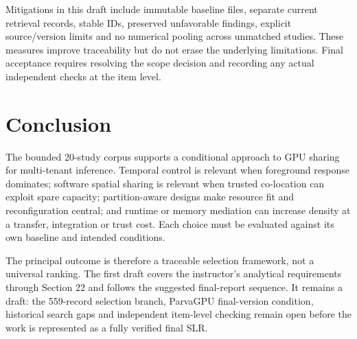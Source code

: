 Mitigations in this draft include immutable baseline files, separate current retrieval records, stable IDs, preserved unfavorable findings, explicit source/version limits and no numerical pooling across unmatched studies. These measures improve traceability but do not erase the underlying limitations. Final acceptance requires resolving the scope decision and recording any actual independent checks at the item level.

\section{Conclusion}
The bounded 20-study corpus supports a conditional approach to GPU sharing for multi-tenant inference. Temporal control is relevant when foreground response dominates; software spatial sharing is relevant when trusted co-location can exploit spare capacity; partition-aware designs make resource fit and reconfiguration central; and runtime or memory mediation can increase density at a transfer, integration or trust cost. Each choice must be evaluated against its own baseline and intended conditions.

The principal outcome is therefore a traceable selection framework, not a universal ranking. The first draft covers the instructor's analytical requirements through Section 22 and follows the suggested final-report sequence. It remains a draft: the 559-record selection branch, ParvaGPU final-version condition, historical search gaps and independent item-level checking remain open before the work is represented as a fully verified final SLR.
